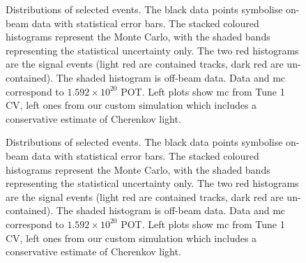 \begin{figure}[]
\centering
{} \quad
{} \quad
{} \quad
{} \quad
{} \quad
{} \quad
\caption{Distributions of selected events. The black data points symbolise on-beam data with statistical error bars. The stacked coloured histograms represent the Monte Carlo, with the shaded bands representing the statistical uncertainty only. The two red histograms are the signal events (light red are contained tracks, dark red are un-contained). The shaded histogram is off-beam data. Data and \acrshort{mc} correspond to $1.592 \times 10^{20}$ POT. Left plots show \acrshort{mc} from Tune 1 CV, left ones from our custom simulation which includes a conservative estimate of Cherenkov light.}
\label{fig:cv_ch_comparison}
\end{figure}

\begin{figure}[]
\ContinuedFloat
\centering
{} \quad
{} \quad
{} \quad
{} \quad
{} \quad
{} \quad
\caption{Distributions of selected events. The black data points symbolise on-beam data with statistical error bars. The stacked coloured histograms represent the Monte Carlo, with the shaded bands representing the statistical uncertainty only. The two red histograms are the signal events (light red are contained tracks, dark red are un-contained). The shaded histogram is off-beam data. Data and \acrshort{mc} correspond to $1.592 \times 10^{20}$ POT. Left plots show \acrshort{mc} from Tune 1 CV, left ones from our custom simulation which includes a conservative estimate of Cherenkov light.}
\label{fig:cv_ch_comparison}
\end{figure}

